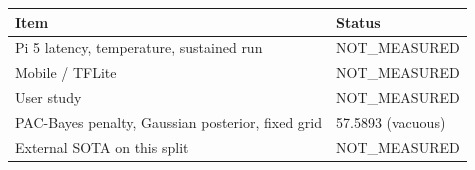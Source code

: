 \begin{tabular}{ll}
\hline
Item & Status \\
\hline
Pi 5 latency, temperature, sustained run & NOT\_MEASURED \\
Mobile / TFLite & NOT\_MEASURED \\
User study & NOT\_MEASURED \\
PAC-Bayes penalty, Gaussian posterior, fixed grid & 57.5893 (vacuous) \\
External SOTA on this split & NOT\_MEASURED \\
\hline
\end{tabular}
